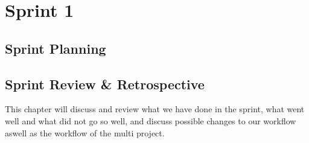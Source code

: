 \part{Sprint 1}
\chapter{Sprint Planning}


\chapter{Sprint Review \& Retrospective}
This chapter will discuss and review what we have done in the sprint, what went well and what did not go so well, and discuss possible changes to our workflow aswell as the workflow of the multi project.





